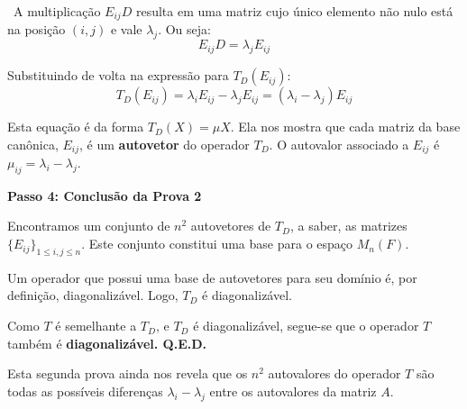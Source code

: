 \textbullet\ A multiplicação $E_{ij}D$ resulta em uma matriz cujo único elemento não nulo está na posição
$(i,j)$ e vale $\lambda_j$. Ou seja:
\[
E_{ij}D = \lambda_j E_{ij}
\]

Substituindo de volta na expressão para $T_D(E_{ij})$:
\[
T_D(E_{ij}) = \lambda_i E_{ij} - \lambda_j E_{ij} = (\lambda_i - \lambda_j)E_{ij}
\]

Esta equação é da forma $T_D(X) = \mu X$. Ela nos mostra que cada matriz da base canônica, $E_{ij}$, é
um \textbf{autovetor} do operador $T_D$. O autovalor associado a $E_{ij}$ é $\mu_{ij} = \lambda_i - \lambda_j$.

\textbf{Passo 4: Conclusão da Prova 2}

Encontramos um conjunto de $n^2$ autovetores de $T_D$, a saber, as matrizes $\{E_{ij}\}_{1 \leq i,j \leq n}$.
Este conjunto constitui uma base para o espaço $M_n(F)$.

Um operador que possui uma base de autovetores para seu domínio é, por definição, diagonalizável.
Logo, $T_D$ é diagonalizável.

Como $T$ é semelhante a $T_D$, e $T_D$ é diagonalizável, segue-se que o operador $T$ também é
\textbf{diagonalizável. Q.E.D.}

Esta segunda prova ainda nos revela que os $n^2$ autovalores do operador $T$ são todas as possíveis
diferenças $\lambda_i - \lambda_j$ entre os autovalores da matriz $A$.
